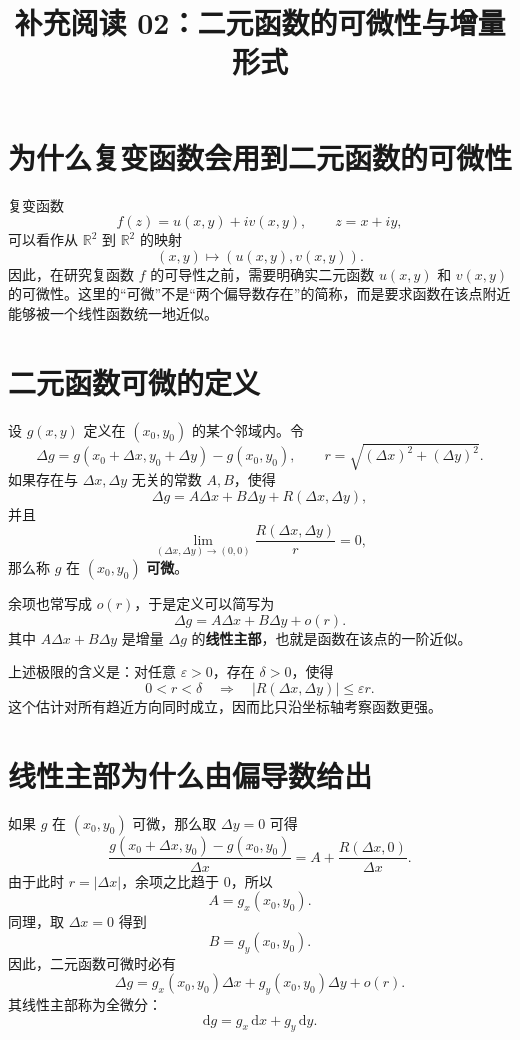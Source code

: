 \documentclass[UTF8,11pt]{ctexart}
\title{\textcolor{courseblue}{补充阅读 02：二元函数的可微性与增量形式}}
\author{}
\date{}
\newcommand{\R}{\mathbb{R}}
\newcommand{\abs}[1]{\left\lvert#1\right\rvert}
\begin{document}
\maketitle
\vspace{-2.2em}

\section{为什么复变函数会用到二元函数的可微性}

复变函数
\[
f(z)=u(x,y)+iv(x,y),\qquad z=x+iy,
\]
可以看作从 $\R^2$ 到 $\R^2$ 的映射
\[
(x,y)\longmapsto (u(x,y),v(x,y)).
\]
因此，在研究复函数 $f$ 的可导性之前，需要明确实二元函数
$u(x,y)$ 和 $v(x,y)$ 的可微性。这里的“可微”不是“两个偏导数存在”的简称，而是要求函数在该点附近能够被一个线性函数统一地近似。

\section{二元函数可微的定义}

设 $g(x,y)$ 定义在 $(x_0,y_0)$ 的某个邻域内。令
\[
\Delta g
=g(x_0+\Delta x,y_0+\Delta y)-g(x_0,y_0),
\qquad
r=\sqrt{(\Delta x)^2+(\Delta y)^2}.
\]
如果存在与 $\Delta x,\Delta y$ 无关的常数 $A,B$，使得
\[
\Delta g=A\Delta x+B\Delta y+R(\Delta x,\Delta y),
\]
并且
\[
\lim_{(\Delta x,\Delta y)\to(0,0)}
\frac{R(\Delta x,\Delta y)}{r}=0,
\]
那么称 $g$ 在 $(x_0,y_0)$ \textbf{可微}。

余项也常写成 $o(r)$，于是定义可以简写为
\[
\boxed{\Delta g=A\Delta x+B\Delta y+o(r).}
\]
其中 $A\Delta x+B\Delta y$ 是增量 $\Delta g$ 的\textbf{线性主部}，也就是函数在该点的一阶近似。

上述极限的含义是：对任意 $\varepsilon>0$，存在 $\delta>0$，使得
\[
0<r<\delta
\quad\Longrightarrow\quad
\abs{R(\Delta x,\Delta y)}\leq\varepsilon r.
\]
这个估计对所有趋近方向同时成立，因而比只沿坐标轴考察函数更强。

\section{线性主部为什么由偏导数给出}

如果 $g$ 在 $(x_0,y_0)$ 可微，那么取 $\Delta y=0$ 可得
\[
\frac{g(x_0+\Delta x,y_0)-g(x_0,y_0)}{\Delta x}
=A+\frac{R(\Delta x,0)}{\Delta x}.
\]
由于此时 $r=\abs{\Delta x}$，余项之比趋于 $0$，所以
\[
A=g_x(x_0,y_0).
\]
同理，取 $\Delta x=0$ 得到
\[
B=g_y(x_0,y_0).
\]
因此，二元函数可微时必有
\[
\boxed{
\Delta g
=g_x(x_0,y_0)\Delta x
+g_y(x_0,y_0)\Delta y
+o(r).
}
\]
其线性主部称为全微分：
\[
\mathrm{d}g=g_x\,\mathrm{d}x+g_y\,\mathrm{d}y.
\]
\end{document}
